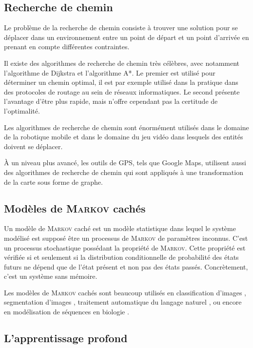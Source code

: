 \subsection{Recherche de chemin}

Le problème de la recherche de chemin consiste à trouver une solution pour se déplacer dans un environnement entre un point de départ et un point d'arrivée en prenant en compte différentes contraintes.

Il existe des algorithmes de recherche de chemin très célèbres, avec notamment l'algorithme de Dijkstra et l'algorithme A*.
Le premier est utilisé pour déterminer un chemin optimal, il est par exemple utilisé dans la pratique dans des protocoles de routage au sein de réseaux informatiques.
Le second présente l'avantage d'être plus rapide, mais n'offre cependant pas la certitude de l'optimalité.

Les algorithmes de recherche de chemin sont énormément utilisés dans le domaine de la robotique mobile et dans le domaine du jeu vidéo dans lesquels des entités doivent se déplacer.

À un niveau plus avancé, les outils de GPS, tels que Google Maps, utilisent aussi des algorithmes de recherche de chemin qui sont appliqués à une transformation de la carte sous forme de graphe.

\subsection{Modèles de \textsc{Markov} cachés}

Un modèle de \textsc{Markov} caché est un modèle statistique dans lequel le système modélisé est supposé être un processus de \textsc{Markov} de paramètres inconnus.
C'est un processus stochastique possédant la propriété de \textsc{Markov}.
Cette propriété est vérifiée si et seulement si la distribution conditionnelle de probabilité des états futurs ne dépend que de l'état présent et non pas des états passés.
Concrètement, c'est un système sans mémoire.

Les modèles de \textsc{Markov} cachés sont beaucoup utilisés en classification d'images \cite{hmm_classification}, segmentation d'images \cite{hmm_segmentation}, traitement automatique du langage naturel \cite{hmm_speech}, ou encore en modélisation de séquences en biologie \cite{hmm_bio}.

\subsection{L'apprentissage profond}


